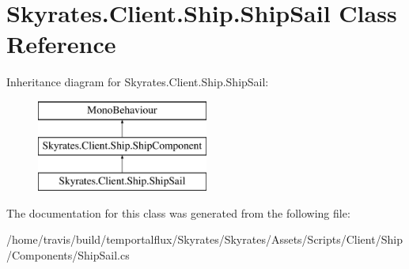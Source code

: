 \hypertarget{class_skyrates_1_1_client_1_1_ship_1_1_ship_sail}{\section{Skyrates.\-Client.\-Ship.\-Ship\-Sail Class Reference}
\label{class_skyrates_1_1_client_1_1_ship_1_1_ship_sail}
}
Inheritance diagram for Skyrates.\-Client.\-Ship.\-Ship\-Sail\-:\begin{figure}[H]
\begin{center}
\leavevmode
\includegraphics[height=3.000000cm]{class_skyrates_1_1_client_1_1_ship_1_1_ship_sail}
\end{center}
\end{figure}


The documentation for this class was generated from the following file\-:\begin{DoxyCompactItemize}
\item 
/home/travis/build/temportalflux/\-Skyrates/\-Skyrates/\-Assets/\-Scripts/\-Client/\-Ship/\-Components/Ship\-Sail.\-cs\end{DoxyCompactItemize}
